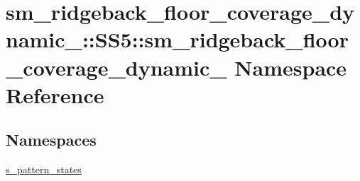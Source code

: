 \hypertarget{namespacesm__ridgeback__floor__coverage__dynamic__1_1_1SS5_1_1sm__ridgeback__floor__coverage__dynamic__1}{}\section{sm\+\_\+ridgeback\+\_\+floor\+\_\+coverage\+\_\+dynamic\+\_\+:\+:S\+S5\+:\+:sm\+\_\+ridgeback\+\_\+floor\+\_\+coverage\+\_\+dynamic\+\_ Namespace Reference}
\label{namespacesm__ridgeback__floor__coverage__dynamic__1_1_1SS5_1_1sm__ridgeback__floor__coverage__dynamic__1}
\subsection*{Namespaces}
\begin{DoxyCompactItemize}
\item 
 \hyperlink{namespacesm__ridgeback__floor__coverage__dynamic__1_1_1SS5_1_1sm__ridgeback__floor__coverage__dynamic__1_1_1s__pattern__states}{s\+\_\+pattern\+\_\+states}
\end{DoxyCompactItemize}
